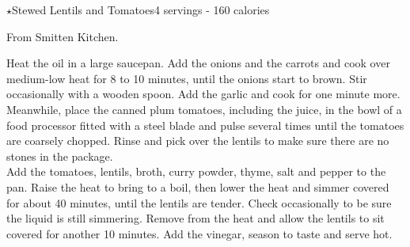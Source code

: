 \begin{recipe}{\texorpdfstring{$\star$}{str}Stewed Lentils and Tomatoes}{4 servings - 160 calories}{}

\freeform From Smitten Kitchen.


Heat the oil in a large saucepan. Add the onions and the carrots and cook over medium-low heat for 8 to 10 minutes, until the onions start to brown. Stir occasionally with a wooden spoon. Add the garlic and cook for one minute more.\\

Meanwhile, place the canned plum tomatoes, including the juice, in the bowl of a food processor fitted with a steel blade and pulse several times until the tomatoes are coarsely chopped. Rinse and pick over the lentils to make sure there are no stones in the package.\\

Add the tomatoes, lentils, broth, curry powder, thyme, salt and pepper to the pan. Raise the heat to bring to a boil, then lower the heat and simmer covered for about 40 minutes, until the lentils are tender. Check occasionally to be sure the liquid is still simmering. Remove from the heat and allow the lentils to sit covered for another 10 minutes. Add the vinegar, season to taste and serve hot.

\end{recipe}